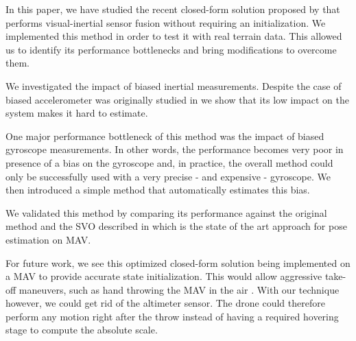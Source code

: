 \documentclass[letterpaper, 10 pt, conference]{ieeeconf}  %
\begin{document}
In this paper, we have studied the recent closed-form solution proposed by \cite{Martinelli2014} that performs visual-inertial sensor fusion without requiring an initialization.
We implemented this method in order to test it with real terrain data.
This allowed us to identify its performance bottlenecks and bring modifications to overcome them.

We investigated the impact of biased inertial measurements.
Despite the case of biased accelerometer was originally studied in \cite{Martinelli2014} we show that its low impact on the system makes it hard to estimate.

One major performance bottleneck of this method was the impact of biased gyroscope measurements.
In other words, the performance becomes very poor in presence of a bias on the gyroscope and, in practice, the overall method could only be successfully used with a very precise - and expensive - gyroscope.
We then introduced a simple method that automatically estimates this bias.



We validated this method by comparing its performance against the original method and the SVO described in \cite{Forster2014} which is the state of the art approach for pose estimation on MAV.

For future work, we see this optimized closed-form solution being implemented on a MAV to provide accurate state initialization.
This would allow aggressive take-off maneuvers, such as hand throwing the MAV in the air \cite{Faessler2015}.
With our technique however, we could get rid of the altimeter sensor.
The drone could therefore perform any motion right after the throw instead of having a required hovering stage to compute the absolute scale.



\end{document}
